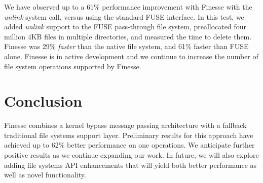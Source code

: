 \documentclass[sigplan,10pt,letter,plain]{acmart}
\begin{document}
We have observed up to a 61\% performance improvement with Finesse with the \textit{unlink} system call, versus using the standard FUSE interface. In this test, we added \textit{unlink} support to the FUSE pass-through file system, preallocated four million 4KB files in multiple directories, and measured the time to delete them.  Finesse was 29\% \textit{faster} than the native file system, and 61\% faster than FUSE alone.  Finesse is in active development and we continue to increase the number of file system operations supported by Finesse.

\section{Conclusion}

Finesse combines a kernel bypass message passing architecture with a fallback traditional file systems support layer.  Preliminary results for this approach have achieved up to 62\% better performance on one operations.  We anticipate further positive results as we continue expanding our work. In future, we will also explore adding file systems API enhancements that will yield both better performance as well as novel functionality.







\end{document}
